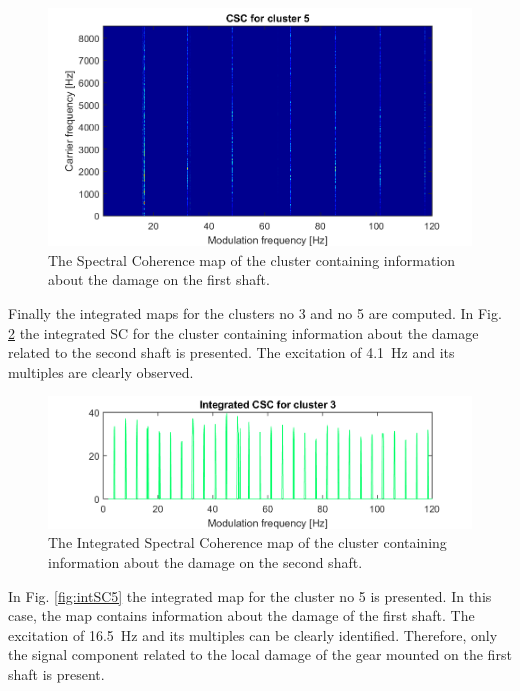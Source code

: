 \documentclass[11pt]{article}
\begin{document}
\begin{figure}[h!]
\begin{center}
\includegraphics[width=\textwidth]{wykresy/212_SC_cluster_5.png}
\caption{The Spectral Coherence map of the cluster containing information about the damage on the first shaft.}
\label{fig:SC_cluster5}
\end{center}
\end{figure}
%
Finally the integrated maps for the clusters no 3 and no 5 are computed. In Fig. \ref{fig:intSC3} the integrated SC for the cluster containing information about the damage related to the second shaft is presented. The excitation of 4.1~Hz and its multiples are clearly observed. 
\begin{figure}[h!]
\begin{center}
\includegraphics[width=\textwidth]{wykresy/212_cluster_sum_3.png}
\caption{The Integrated Spectral Coherence map of the cluster containing information about the damage on the second shaft.}
\label{fig:intSC3}
\end{center}
\end{figure}
In Fig. \ref{fig:intSC5} the integrated map for the cluster no 5 is presented. In this case, the map contains  information about the damage of the first shaft. The excitation of 16.5~Hz and its multiples can be clearly identified. Therefore, only the signal component related to the local damage of the gear mounted on the first shaft is present.
\end{document}
